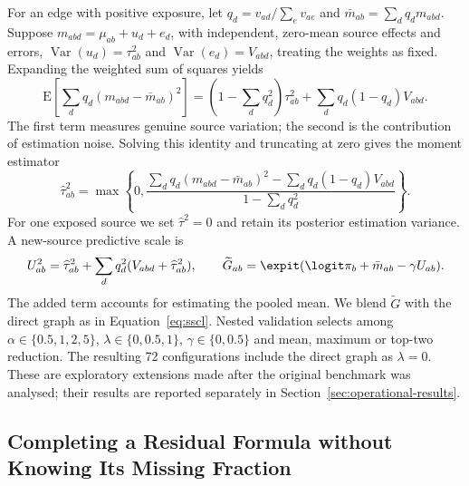 For an edge with positive exposure, let $q_d=v_{ad}/\sum_e v_{ae}$ and $\bar m_{ab}=\sum_d q_dm_{abd}$. Suppose $m_{abd}=\mu_{ab}+u_d+e_d$, with independent, zero-mean source effects and errors, $\operatorname{Var}(u_d)=\tau_{ab}^2$ and $\operatorname{Var}(e_d)=V_{abd}$, treating the weights as fixed. Expanding the weighted sum of squares yields
\begin{equation}
\mathrm E\!\left[\sum_dq_d(m_{abd}-\bar m_{ab})^2\right]
=\left(1-\sum_dq_d^2\right)\tau_{ab}^2+\sum_dq_d(1-q_d)V_{abd}.
\label{eq:variance-decomposition}
\end{equation}
The first term measures genuine source variation; the second is the contribution of estimation noise. Solving this identity and truncating at zero gives the moment estimator
\begin{equation}
\widehat\tau_{ab}^2=
\max\!\left\{0,\frac{\sum_dq_d(m_{abd}-\bar m_{ab})^2-\sum_dq_d(1-q_d)V_{abd}}
{1-\sum_dq_d^2}\right\}.
\label{eq:tau-estimator}
\end{equation}
For one exposed source we set $\widehat\tau^2=0$ and retain its posterior estimation variance. A new-source predictive scale is
\begin{equation}
U_{ab}^2=\widehat\tau_{ab}^2+\sum_dq_d^2(V_{abd}+\widehat\tau_{ab}^2),\qquad
\widetilde G_{ab}=\expit(\logit\pi_b+\bar m_{ab}-\gamma U_{ab}).
\label{eq:posterior-edge}
\end{equation}
The added term accounts for estimating the pooled mean. We blend $\widetilde G$ with the direct graph as in Equation~\eqref{eq:sscl}. Nested validation selects among $\alpha\in\{0.5,1,2,5\}$, $\lambda\in\{0,0.5,1\}$, $\gamma\in\{0,0.5\}$ and mean, maximum or top-two reduction. The resulting 72 configurations include the direct graph as $\lambda=0$. These are exploratory extensions made after the original benchmark was analysed; their results are reported separately in Section~\ref{sec:operational-results}.

\subsection{Completing a Residual Formula without Knowing Its Missing Fraction}
\label{sec:operational}

